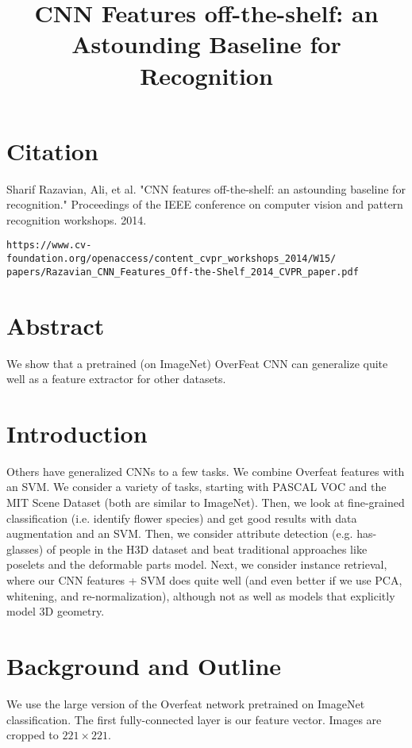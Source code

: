 \documentclass[a4paper]{article}
\title{CNN Features off-the-shelf: an Astounding Baseline for Recognition}
\date{}
\begin{document}
\maketitle

\section{Citation}
Sharif Razavian, Ali, et al. "CNN features off-the-shelf: an astounding baseline for recognition." Proceedings of the IEEE conference on computer vision and pattern recognition workshops. 2014.

\begin{verbatim}
https://www.cv-foundation.org/openaccess/content_cvpr_workshops_2014/W15/
papers/Razavian_CNN_Features_Off-the-Shelf_2014_CVPR_paper.pdf
\end{verbatim}

\section{Abstract}
We show that a pretrained (on ImageNet) OverFeat CNN can generalize quite well
as a feature extractor for other datasets.

\section{Introduction}
Others have generalized CNNs to a few tasks. We combine Overfeat features with
an SVM. We consider a variety of tasks, starting with PASCAL VOC and the
MIT Scene Dataset (both are similar to ImageNet). Then, we look at fine-grained
classification (i.e. identify flower species) and get good results with
data augmentation and an SVM. Then, we consider attribute detection (e.g.
has-glasses) of people in the H3D dataset and beat traditional approaches
like poselets and the deformable parts model. Next, we consider instance
retrieval, where our CNN features + SVM does quite well (and even better if
we use PCA, whitening, and re-normalization), although not as well as models
that explicitly model 3D geometry.

\section{Background and Outline}
We use the large version of the Overfeat network pretrained on ImageNet
classification. The first fully-connected layer is our feature vector.
Images are cropped to $221 \times 221$.
\end{document}
